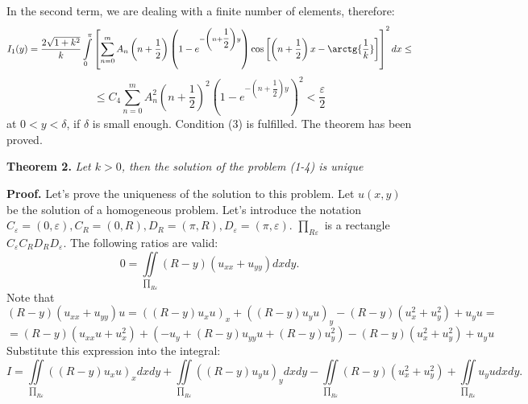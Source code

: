 \documentclass[11pt,twoside]{article}
\begin{document}
	In the second term, we are dealing with a finite number of elements, therefore:
	\begin{equation*}
		I_1(y) =\dfrac{2\sqrt{1+ k^2}}{k}\int\limits_0^\pi \left[\sum\limits_{n=0}^{m} A_n\left(n+\dfrac12\right) \left(1 - e^{-\left(n+\dfrac12\right)y} \right)\cos{\left[\left(n + \dfrac12 \right)x  - \arctg{\dfrac{1}{k}}\right]} \right]^2 dx \leq
	\end{equation*}
	\begin{equation*}
		\leq C_4 \sum\limits_{n=0}^{m} A_n^2 \left(n +\dfrac12\right)^2 \left(1 - e^{-\left(n+\dfrac12\right)y} \right)^2 < \dfrac{\varepsilon}{2}
	\end{equation*}
	at $0 < y < \delta$, if $\delta$ is small enough. Condition (3) is fulfilled. The theorem has been proved.
	\par
	\textbf{Theorem 2.} \textit{Let $k > 0$, then the solution of the problem (1-4) is unique}
	\par
	\textbf{Proof.} Let's prove the uniqueness of the solution to this problem. Let $u(x,y)$ be the solution of a homogeneous problem.
	Let's introduce the notation $C_\varepsilon = (0,\varepsilon), C_R= (0, R), D_R= (\pi, R), D_\varepsilon = (\pi, \varepsilon)$. $\prod_{R\varepsilon}$ is a rectangle $C_\varepsilon C_R D_R D_\varepsilon$. The following ratios are valid:
	\begin{equation*}
		0 = \iint\limits_{\prod_{R\varepsilon}} (R-y) (u_{xx} + u_{yy}) dx dy.
	\end{equation*}
	Note that
	\begin{equation*}
		(R - y) (u_{xx} + u_{yy}) u = \left( \left(R - y\right) u_x u\right)_x  + \left( \left(R - y\right) u_y u\right)_y - \left(R- y\right) \left(u_x^2 + u_y^2\right) +  u_y u = 
	\end{equation*}
	\begin{equation*}
		= \left(R-y\right) \left(u_{xx} u + u_x^2\right) + \left(-u_y + \left(R-y\right) u_{yy} u + \left(R-y\right)u_y^2\right) - \left(R- y\right) \left(u_x^2 + u_y^2\right)+  u_y u
	\end{equation*}
	Substitute this expression into the integral:
	\begin{equation*}
		I	=	\iint\limits_{\prod_{R\varepsilon}} \left( \left(R - y\right) u_x u\right)_x dx dy  + \iint\limits_{\prod_{R\varepsilon}} \left( \left(R - y\right) u_y u\right)_y dx dy  
		- \iint\limits_{\prod_{R\varepsilon}} \left(R- y\right) \left(u_x^2 + u_y^2\right) + \iint\limits_{\prod_{R\varepsilon}} u_y u dx dy.
	\end{equation*}
\end{document}
